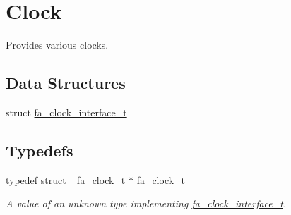 \hypertarget{group___fa_clock}{\section{Clock}
\label{group___fa_clock}
}


Provides various clocks.  


\subsection*{Data Structures}
\begin{DoxyCompactItemize}
\item 
struct \hyperlink{structfa__clock__interface__t}{fa\-\_\-clock\-\_\-interface\-\_\-t}
\end{DoxyCompactItemize}
\subsection*{Typedefs}
\begin{DoxyCompactItemize}
\item 
typedef struct \-\_\-fa\-\_\-clock\-\_\-t $\ast$ \hyperlink{group___fa_clock_ga20b3a0f49788fbedba140b1d315d2313}{fa\-\_\-clock\-\_\-t}
\begin{DoxyCompactList}\small\item\em A value of an unknown type implementing \hyperlink{structfa__clock__interface__t}{fa\-\_\-clock\-\_\-interface\-\_\-t}. \end{DoxyCompactList}\end{DoxyCompactItemize}

